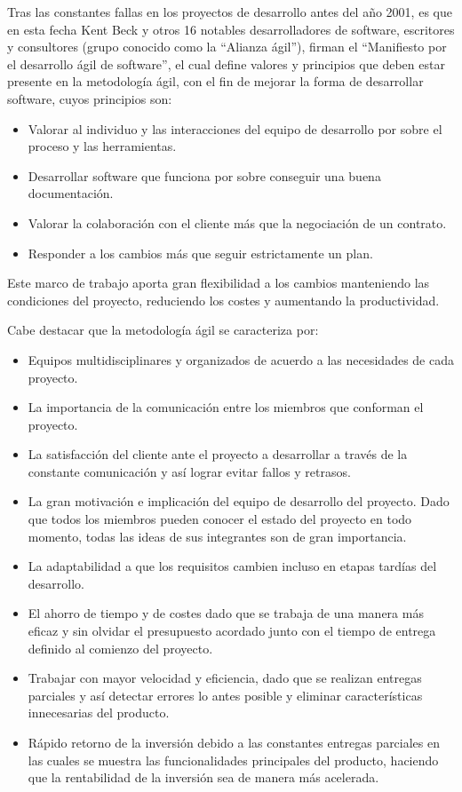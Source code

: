 Tras las constantes fallas en los proyectos de desarrollo antes del año 2001, es que en esta fecha Kent Beck y otros 16 notables desarrolladores de software, escritores y consultores (grupo conocido como la ``Alianza ágil''), firman el ``Manifiesto por el desarrollo ágil de software'', el cual define valores y principios que deben estar presente en la metodología ágil, con el fin de mejorar la forma de desarrollar software, cuyos principios son:

\begin{itemize}
    \item Valorar al individuo y las interacciones del equipo de desarrollo por sobre el proceso y las herramientas.
    \item Desarrollar software que funciona por sobre conseguir una buena documentación.
    \item Valorar la colaboración con el cliente más que la negociación de un contrato.
    \item Responder a los cambios más que seguir estrictamente un plan.
\end{itemize}

Este marco de trabajo aporta gran flexibilidad a los cambios manteniendo las condiciones del proyecto, reduciendo los costes y aumentando la productividad.

Cabe destacar que la metodología ágil se caracteriza por:

\begin{itemize}
    \item Equipos multidisciplinares y organizados de acuerdo a las necesidades de cada proyecto.
    \item La importancia de la comunicación entre los miembros que conforman el proyecto.
    \item La satisfacción del cliente ante el proyecto a desarrollar a través de la constante comunicación y así lograr evitar fallos y retrasos.
    \item La gran motivación e implicación del equipo de desarrollo del proyecto. Dado que todos los miembros pueden conocer el estado del proyecto en todo momento, todas las ideas de sus integrantes son de gran importancia.
    \item La adaptabilidad a que los requisitos cambien incluso en etapas tardías del desarrollo.
    \item El ahorro de tiempo y de costes dado que se trabaja de una manera más eficaz y sin olvidar el presupuesto acordado junto con el tiempo de entrega definido al comienzo del proyecto.
    \item Trabajar con mayor velocidad y eficiencia, dado que se realizan entregas parciales y así detectar errores lo antes posible y eliminar características innecesarias del producto.
    \item Rápido retorno de la inversión debido a las constantes entregas parciales en las cuales se muestra las funcionalidades principales del producto, haciendo que la rentabilidad de la inversión sea de manera más acelerada.
\end{itemize}

